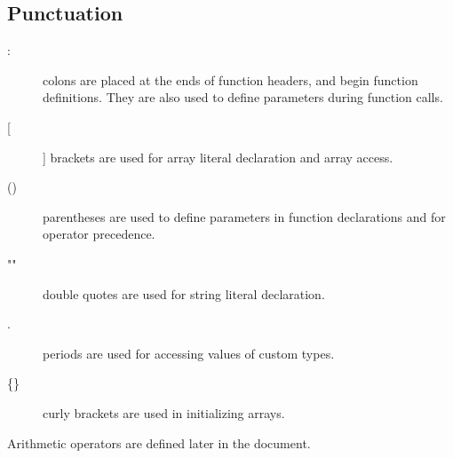 \documentclass[12pt]{report}
\begin{document}
    \subsection*{Punctuation}
    
    \begin{description}

	\item[:] colons are placed at the ends of function headers, and begin function definitions. They are also used to define parameters during function calls.
    
    \item[[]] brackets are used for array literal declaration and array access.
    
    \item[()] parentheses are used to define parameters in function declarations and for operator precedence.
    
    \item[""] double quotes are used for string literal declaration.
    
    \item[.] periods are used for accessing values of custom types.
    
    \item[\{\}] curly brackets are used in initializing arrays.
    
    \end{description}
        
    \noindent
 	Arithmetic operators are defined later in the document.
    
\end{document}

